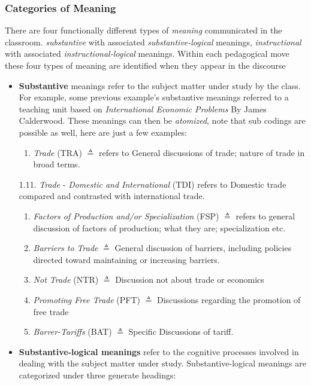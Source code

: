 \documentclass[10pt, letterpaper]{article}
\begin{document}
\subsubsection*{Categories of Meaning}
\label{sec:orgdbcdb3c}
There are four functionally different types of \emph{meaning} communicated in the classroom. \emph{substantive} with associated \emph{substantive-logical} meanings, \emph{instructional} with associated \emph{instructional-logical} meanings. Within each pedagogical move these four types of meaning are identified when they appear in the discourse
\begin{itemize}
\item \textbf{Substantive}
\label{sec:orga4fffa9}
meanings refer to the subject matter under study by the class. For example, some previous example's substantive meanings referred to a teaching unit based on \emph{International Economic Problems} By James Calderwood. These meanings can then be \emph{atomized}, note that sub codings are possible as well, here are just a few examples:
\begin{enumerate}
\item \emph{Trade} (TRA) \(\triangleq\) refers to General discussions of trade; nature of trade in broad terms.
\end{enumerate}
1.11. \emph{Trade} - \emph{Domestic and International} (TDI) \triangeq refers to Domestic trade compared and contrasted with international trade.
\begin{enumerate}
\item \emph{Factors of Production and/or Specialization} (FSP) \(\triangleq\) refers to general discussion of factors of production; what they are; specialization etc.
\item \emph{Barriers to Trade} \(\triangleq\) General discussion of barriers, including policies directed toward maintaining or increasing barriers.
\item \emph{Not Trade} (NTR) \(\triangleq\) Discussion not about trade or economics
\item \emph{Promoting Free Trade} (PFT) \(\triangleq\) Discussions regarding the promotion of free trade
\item \emph{Barrer-Tariffs} (BAT) \(\triangleq\) Specific Discussions of tariff.
\end{enumerate}
\item \textbf{Substantive-logical meanings}
\label{sec:orga4b2c78}
refer to the cognitive processes involved in dealing with the subject matter under study. Substantive-logical meanings are categorized under three generate headings:

\end{itemize}
\end{document}
